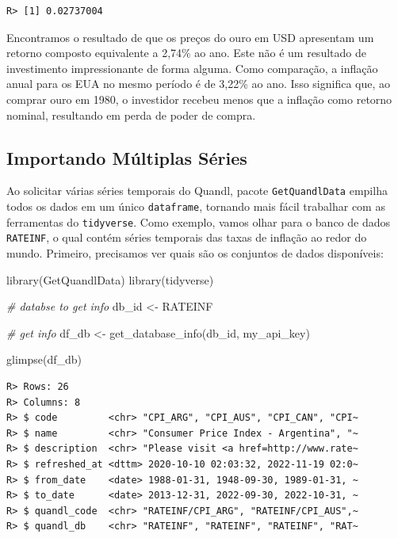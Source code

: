 \documentclass[
  11pt,
]{book}
\newenvironment{Shaded}{\begin{snugshade}}{\end{snugshade}}
\newcommand{\CommentTok}[1]{\textcolor[rgb]{0.37,0.37,0.37}{\textit{#1}}}
\newcommand{\FunctionTok}[1]{\textcolor[rgb]{0,0,0}{#1}}
\newcommand{\NormalTok}[1]{#1}
\newcommand{\OtherTok}[1]{\textcolor[rgb]{0.37,0.37,0.37}{#1}}
\newcommand{\StringTok}[1]{\textcolor[rgb]{0.5,0.5,0.5}{#1}}
\begin{document}
\begin{verbatim}
R> [1] 0.02737004
\end{verbatim}

Encontramos o resultado de que os preços do ouro em USD apresentam um retorno composto equivalente a 2,74\% ao ano. Este não é um resultado de investimento impressionante de forma alguma. Como comparação, a inflação anual para os EUA no mesmo período é de 3,22\% ao ano. Isso significa que, ao comprar ouro em 1980, o investidor recebeu menos que a inflação como retorno nominal, resultando em perda de poder de compra.

\hypertarget{importando-muxfaltiplas-suxe9ries}{%
\subsection{Importando Múltiplas Séries}\label{importando-muxfaltiplas-suxe9ries}}

Ao solicitar várias séries temporais do Quandl, pacote \texttt{GetQuandlData} empilha todos os dados em um único \texttt{dataframe}, tornando mais fácil trabalhar com as ferramentas do \texttt{tidyverse}. Como exemplo, vamos olhar para o banco de dados \texttt{RATEINF}, o qual contém séries temporais das taxas de inflação ao redor do mundo. Primeiro, precisamos ver quais são os conjuntos de dados disponíveis:

\begin{Shaded}
\begin{Highlighting}[]
\FunctionTok{library}\NormalTok{(GetQuandlData)}
\FunctionTok{library}\NormalTok{(tidyverse)}

\CommentTok{\# databse to get info}
\NormalTok{db\_id }\OtherTok{\textless{}{-}} \StringTok{\textquotesingle{}RATEINF\textquotesingle{}}

\CommentTok{\# get info }
\NormalTok{df\_db }\OtherTok{\textless{}{-}} \FunctionTok{get\_database\_info}\NormalTok{(db\_id, my\_api\_key)}

\FunctionTok{glimpse}\NormalTok{(df\_db)}
\end{Highlighting}
\end{Shaded}

\begin{verbatim}
R> Rows: 26
R> Columns: 8
R> $ code         <chr> "CPI_ARG", "CPI_AUS", "CPI_CAN", "CPI~
R> $ name         <chr> "Consumer Price Index - Argentina", "~
R> $ description  <chr> "Please visit <a href=http://www.rate~
R> $ refreshed_at <dttm> 2020-10-10 02:03:32, 2022-11-19 02:0~
R> $ from_date    <date> 1988-01-31, 1948-09-30, 1989-01-31, ~
R> $ to_date      <date> 2013-12-31, 2022-09-30, 2022-10-31, ~
R> $ quandl_code  <chr> "RATEINF/CPI_ARG", "RATEINF/CPI_AUS",~
R> $ quandl_db    <chr> "RATEINF", "RATEINF", "RATEINF", "RAT~
\end{verbatim}
\end{document}
